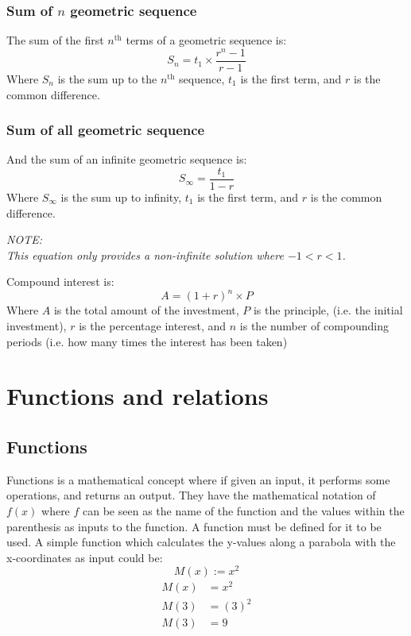 \documentclass{book}
\newenvironment{note}{\begin{center}\em NOTE:\\}{\end{center}}
\begin{document}
\subsection{Sum of $n$ geometric sequence}
The sum of the first $n^{\text{th}}$ terms of a geometric sequence is:
\[
	S_n = t_1 \times \frac{r^n - 1}{r - 1}
\]
Where $S_n$ is the sum up to the $n^{\text{th}}$ sequence, $t_1$ is the first term, and $r$ is the common difference.

\subsection{Sum of all geometric sequence}
And the sum of an infinite geometric sequence is:
\[
	S_{\infty} = \frac{t_1}{1 - r}
\]
Where $S_{\infty}$ is the sum up to infinity, $t_1$ is the first term, and $r$ is the common difference.
\begin{note}
	This equation only provides a non-infinite solution where $-1 < r < 1$.
\end{note}

Compound interest is:
\[
	A = (1 + r)^n \times P
\]
Where $A$ is the total amount of the investment, $P$ is the principle, (i.e. the initial investment), $r$ is the percentage interest, and $n$ is the number of compounding periods (i.e. how many times the interest has been taken)

\chapter{Functions and relations}
\section{Functions}
Functions is a mathematical concept where if given an input, it performs some operations, and returns an output.  They have the mathematical notation of $f(x)$ where $f$ can be seen as the name of the function and the values within the parenthesis as inputs to the function.  A function must be defined for it to be used.  A simple function which calculates the y-values along a parabola with the x-coordinates as input could be:
\[
	M(x) := x^2
\]
\begin{align*}
	M(x) & = x^2   \\
	M(3) & = (3)^2 \\
	M(3) & = 9
\end{align*}
\end{document}
